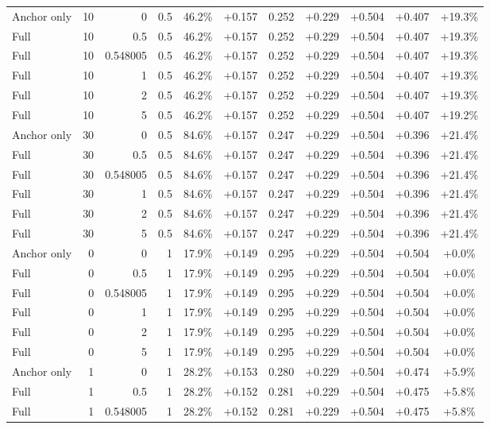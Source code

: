 \begin{table}[htbp]
\begin{tabular}{lrrrccccccc}
Anchor only & 10 & 0 & 0.5 & 46.2\% & +0.157 & 0.252 & +0.229 & +0.504 & +0.407 & +19.3\% \\
Full & 10 & 0.5 & 0.5 & 46.2\% & +0.157 & 0.252 & +0.229 & +0.504 & +0.407 & +19.3\% \\
Full & 10 & 0.548005 & 0.5 & 46.2\% & +0.157 & 0.252 & +0.229 & +0.504 & +0.407 & +19.3\% \\
Full & 10 & 1 & 0.5 & 46.2\% & +0.157 & 0.252 & +0.229 & +0.504 & +0.407 & +19.3\% \\
Full & 10 & 2 & 0.5 & 46.2\% & +0.157 & 0.252 & +0.229 & +0.504 & +0.407 & +19.3\% \\
Full & 10 & 5 & 0.5 & 46.2\% & +0.157 & 0.252 & +0.229 & +0.504 & +0.407 & +19.2\% \\
Anchor only & 30 & 0 & 0.5 & 84.6\% & +0.157 & 0.247 & +0.229 & +0.504 & +0.396 & +21.4\% \\
Full & 30 & 0.5 & 0.5 & 84.6\% & +0.157 & 0.247 & +0.229 & +0.504 & +0.396 & +21.4\% \\
Full & 30 & 0.548005 & 0.5 & 84.6\% & +0.157 & 0.247 & +0.229 & +0.504 & +0.396 & +21.4\% \\
Full & 30 & 1 & 0.5 & 84.6\% & +0.157 & 0.247 & +0.229 & +0.504 & +0.396 & +21.4\% \\
Full & 30 & 2 & 0.5 & 84.6\% & +0.157 & 0.247 & +0.229 & +0.504 & +0.396 & +21.4\% \\
Full & 30 & 5 & 0.5 & 84.6\% & +0.157 & 0.247 & +0.229 & +0.504 & +0.396 & +21.4\% \\
Anchor only & 0 & 0 & 1 & 17.9\% & +0.149 & 0.295 & +0.229 & +0.504 & +0.504 & +0.0\% \\
Full & 0 & 0.5 & 1 & 17.9\% & +0.149 & 0.295 & +0.229 & +0.504 & +0.504 & +0.0\% \\
Full & 0 & 0.548005 & 1 & 17.9\% & +0.149 & 0.295 & +0.229 & +0.504 & +0.504 & +0.0\% \\
Full & 0 & 1 & 1 & 17.9\% & +0.149 & 0.295 & +0.229 & +0.504 & +0.504 & +0.0\% \\
Full & 0 & 2 & 1 & 17.9\% & +0.149 & 0.295 & +0.229 & +0.504 & +0.504 & +0.0\% \\
Full & 0 & 5 & 1 & 17.9\% & +0.149 & 0.295 & +0.229 & +0.504 & +0.504 & +0.0\% \\
Anchor only & 1 & 0 & 1 & 28.2\% & +0.153 & 0.280 & +0.229 & +0.504 & +0.474 & +5.9\% \\
Full & 1 & 0.5 & 1 & 28.2\% & +0.152 & 0.281 & +0.229 & +0.504 & +0.475 & +5.8\% \\
Full & 1 & 0.548005 & 1 & 28.2\% & +0.152 & 0.281 & +0.229 & +0.504 & +0.475 & +5.8\% \\

\end{tabular}
\end{table}
